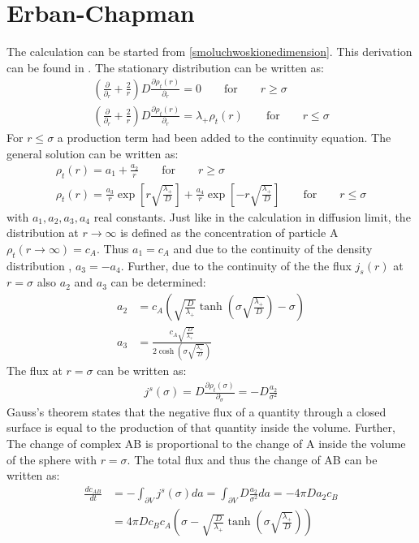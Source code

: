 \documentclass[
  a4paper,BCOR10mm,twoside,
  headsepline,footsepline,%
  fleqn,openbib
]{scrbook}
\begin{document}
\section{Erban-Chapman}\label{Erban-Chapmann}
The calculation can be started from \cref{smoluchwoskionedimension}. This derivation can be found in \cite{Erban2009}. The stationary distribution can be written as:
\begin{align}
\left(\frac{\partial}{\partial_r}+\frac{2}{r} \right) D \frac{\partial\rho_t(r)}{\partial_r}=0 \qquad \text{for} \qquad r \geq \sigma \\
\left(\frac{\partial}{\partial_r}+\frac{2}{r} \right) D \frac{\partial\rho_t(r)}{\partial_r}=\lambda_{+} \rho_t(r)  \qquad \text{for} \qquad r \leq \sigma
\end{align}
For  $r \leq \sigma$ a production term had been added to the continuity equation. The general solution can be written as: 
\begin{align}
\rho_t(r)= a_1+\frac{a_2}{r} \qquad \text{for} \qquad r \geq \sigma \label{erbanchapmanradial1} \\
\rho_t(r)= \frac{a_3}{r} \exp \left[ r \sqrt{\frac{\lambda_{+}}{D}} \right] + \frac{a_4}{r} \exp \left[-r \sqrt{\frac{\lambda_{+}}{D}} \right] \qquad\text{for}\qquad r \leq \sigma \label{erbanchapmanradial}
\end{align}
with $a_1, a_2, a_3, a_4$ real constants. Just like in the calculation in diffusion limit, the distribution at  $r \rightarrow \infty$ is defined as the concentration of particle A $\rho_t(r \rightarrow \infty)=c_A$. Thus $a_1=c_A$ and due to the continuity of the density distribution , $a_3=-a_4$. Further, due to the continuity of the the flux $j_s(r)$ at $r=\sigma$ also $a_2$ and $a_3$ can be determined:
\begin{align}
 a_2&= c_A \left( \sqrt{\frac{D}{\lambda_{+}}} \tanh\left(\sigma \sqrt{\frac{\lambda_{+}}{D}}\right)-\sigma\right)  \\
 a_3&= \frac{c_A  \sqrt{\frac{D}{\lambda_{+}}}}{2 \cosh\left(\sigma \sqrt{\frac{\lambda_{+}}{D}}\right)}
\end{align}
The flux at  $r= \sigma$ can be written as:
\begin{align}
j^{s}(\sigma)=D \frac{\partial\rho_t(\sigma)}{\partial_{\sigma}}= -D \frac{a_2}{\sigma^2} 
\end{align}
Gauss's theorem states that the negative flux of a quantity through a closed surface is equal to the production of that quantity inside the volume. Further, The change of complex AB is proportional to the change of A inside the volume of the sphere with $r=\sigma$. The total flux and thus the change of AB can be written as:
\begin{align}
  \frac{d c_{AB} }{dt}&=- \int_{\partial V} j^{s}(\sigma) da= \int_{\partial V} D \frac{a_2} {\sigma^2}  da =- 4 \pi D a_2 c_B \\ &= 4 \pi D c_B  c_A \left(\sigma -\sqrt{\frac{D}{\lambda_{+}}} \tanh\left(\sigma \sqrt{\frac{\lambda_{+}}{D}}\right)\right)
\end{align}
\end{document}
